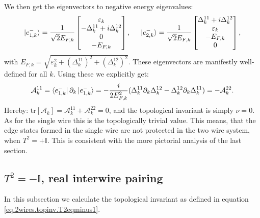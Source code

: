 We then get the eigenvectors to negative energy eigenvalues:
\begin{equation}
\ket{e^{-}_{1,k}} = \frac{1}{\sqrt{2}E_{F,k}}\begin{bmatrix} \varepsilon_k \\ -\Delta^{11}_k + i\Delta^{12}_k \\ 0 \\ -E_{F,k} \end{bmatrix}, \hspace{0.5cm} \ket{e^{-}_{2,k}} = \frac{1}{\sqrt{2}E_{F,k}}\begin{bmatrix} \Delta^{11}_k + i\Delta^{12}_k \\ \varepsilon_k \\  -E_{F,k} \\ 0 \end{bmatrix},
\end{equation}
with $E_{F,k} = \sqrt{\varepsilon_k^2 + (\Delta^{11}_k)^2 + (\Delta^{12}_k)^2}$. These eigenvectors are manifestly well-defined for all $k$. Using these we explicitly get:
\begin{equation}
\mathcal{A}^{11}_k = \bra{e^{-}_{1,k}}\partial_k\ket{e^{-}_{1,k}} = -\frac{i}{2E_{F,k}^2}(\Delta^{11}_k\partial_k\Delta^{12}_k - \Delta^{12}_k\partial_k\Delta^{11}_k) = -\mathcal{A}^{22}_k. \nonumber
\end{equation}
Hereby: $\text{tr}[\mathcal{A}_k] = \mathcal{A}^{11}_k  + \mathcal{A}^{22}_k = 0$, and the topological invariant is simply $\nu = 0$. As for the single wire this is the topologically trivial value. This means, that the edge states formed in the single wire are not protected in the two wire system, when $T^2 = +\mathbb{I}$. This is consistent with the more pictorial analysis of the last section. 

\subsection{$T^2 = -\mathbb{I}$, real interwire pairing}
\label{subsec.2wires_CSinv_Delta12real}
In this subsection we calculate the topological invariant as defined in equation \eqref{eq.2wires.topinv.T2eqminus1}. 

